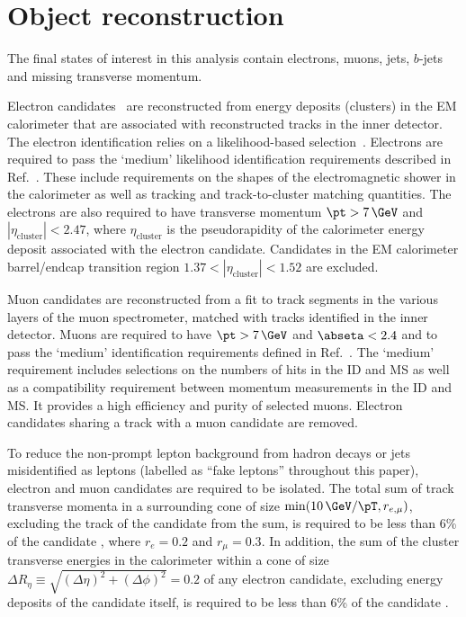 \section{Object reconstruction}
\label{s:objetcs}

The final states of interest in this analysis contain electrons, muons, jets,
$b$-jets and missing transverse momentum.

Electron candidates~\cite{PERF-2013-03} are reconstructed from energy deposits
(clusters) in the EM calorimeter that are associated with reconstructed tracks
in the inner detector.  The electron identification relies on a
likelihood-based selection~\cite{ATLAS-CONF-2014-032,
ATL-PHYS-PUB-2015-041}. Electrons are required to pass the `medium'
likelihood identification requirements described in Ref.~\cite{ATL-PHYS-PUB-2015-041}. These include requirements on the 
shapes of the electromagnetic shower in the calorimeter as well as tracking and track-to-cluster matching quantities. 
The electrons are also required to have transverse momentum $\pt > 7\,\GeV$ and
$|\eta_\text{cluster}| < 2.47$, where $\eta_\text{cluster}$ is the
pseudorapidity of the calorimeter energy deposit associated with the electron
candidate.  Candidates in the EM calorimeter barrel/endcap transition region
$1.37 < |\eta_\text{cluster}| < 1.52$ are excluded.  

Muon candidates are reconstructed from a fit to track segments in the various layers of
the muon spectro\-meter, matched with tracks identified in the inner detector.
Muons are required to have $\pt > 7\,\GeV$ and $\abseta < 2.4$ and to pass the
`medium' identification requirements defined in Ref.~\cite{PERF-2015-10}. The `medium' requirement includes selections on the numbers of hits
in the ID and MS as well as a compatibility requirement between momentum measurements in the ID and MS. It provides a high efficiency and purity of selected muons. Electron candidates sharing a track with a muon candidate are removed.  

To reduce the non-prompt lepton background from hadron decays or jets
misidentified as leptons (labelled as ``fake leptons'' throughout this paper), electron and muon
candidates are required to be isolated. The total sum of track transverse
momenta in a surrounding cone of size $\min(10\,\GeV/\pT, r_{e,\mu})$, excluding the track of the candidate from the sum, is required to be less than 6\% of the candidate \pt, where
$r_e = 0.2$ and $r_{\mu} = 0.3$.  In addition, the sum of the cluster
transverse energies in the calorimeter within a cone of size $\Delta R_{\eta} \equiv
\sqrt{(\Delta\eta)^2 + (\Delta\phi)^2} = 0.2$ of any electron candidate,
excluding energy deposits of the candidate itself, is required to be less than
6\% of the candidate \pt.

